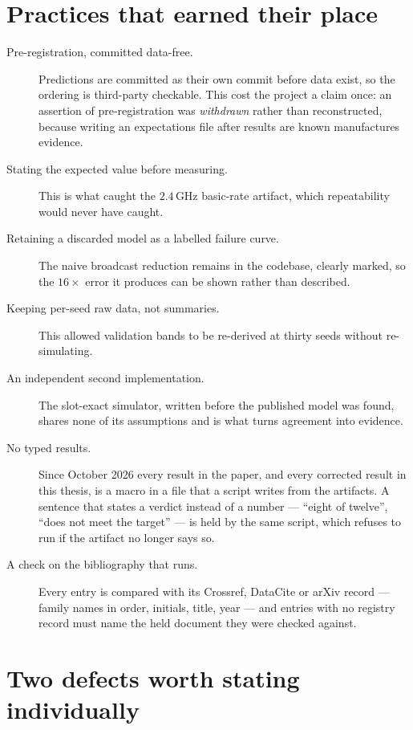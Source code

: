 \section{Practices that earned their place}

\begin{description}
\item[Pre-registration, committed data-free.] Predictions are committed as their own commit before
data exist, so the ordering is third-party checkable. This cost the project a claim once: an
assertion of pre-registration was \emph{withdrawn} rather than reconstructed, because writing an
expectations file after results are known manufactures evidence.

\item[Stating the expected value before measuring.] This is what caught the $2.4$\,GHz
basic-rate artifact, which repeatability would never have caught.

\item[Retaining a discarded model as a labelled failure curve.] The naive broadcast reduction
remains in the codebase, clearly marked, so the $16\times$ error it produces can be shown rather
than described.

\item[Keeping per-seed raw data, not summaries.] This allowed validation bands to be re-derived at
thirty seeds without re-simulating.

\item[An independent second implementation.] The slot-exact simulator, written before the published
model was found, shares none of its assumptions and is what turns agreement into evidence.

\item[No typed results.] Since October 2026 every result in the paper, and every corrected result
in this thesis, is a macro in a file that a script writes from the artifacts. A sentence that
states a verdict instead of a number --- ``eight of twelve'', ``does not meet the target'' --- is
held by the same script, which refuses to run if the artifact no longer says so.

\item[A check on the bibliography that runs.] Every entry is compared with its Crossref, DataCite
or arXiv record --- family names in order, initials, title, year --- and entries with no registry
record must name the held document they were checked against.
\end{description}

\section{Two defects worth stating individually}

